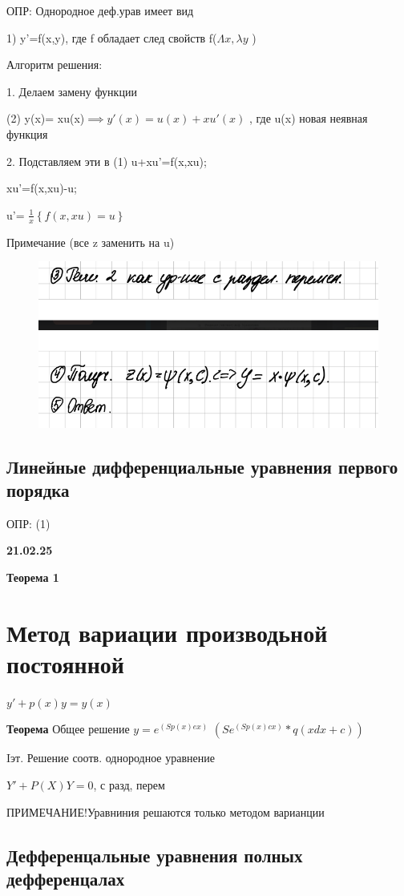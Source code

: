 \documentclass{article}
\begin{document}
 ОПР: Однородное деф.урав имеет вид

1) y'=f(x,y), где f обладает след свойств f($\Lambda x, \lambda y $ )




 Алгоритм решения:

 1. Делаем замену функции
 
 (2) y(x)= xu(x)$\implies y'(x)=u(x)+xu'(x)$
 , где u(x) новая неявная функция

 2. Подставляем эти в (1) u+xu'=f(x,xu);
 
xu'=f(x,xu)-u;

u'= $\frac{1}{x} \left\{f(x,xu)=u\right\}$
 
Примечание (все z заменить на u)
\begin{figure}
    \centering
    \includegraphics[width=0.25\linewidth]{Снимок экрана 2025-02-14 112453.png}
\end{figure}

 \subsection{Линейные дифференциальные уравнения первого порядка}

 ОПР: (1)



 \textbf{21.02.25}

 \textbf{Теорема 1} 

\section{Метод вариации производьной постоянной}

$y'+p(x)y=y(x)$

\textbf{Теорема}
Общее решение $y=e^(Sp(x)ex)$ $(Se^(Sp(x)cx)*q(xdx+c))$

Iэт. Решение соотв. однородное уравнение

$Y'+P(X)Y=0$, с разд, перем



ПРИМЕЧАНИЕ!Уравниния решаются только методом варианции

\subsection{Дефференцальные уравнения полных дефференцалах}
\end{document}
